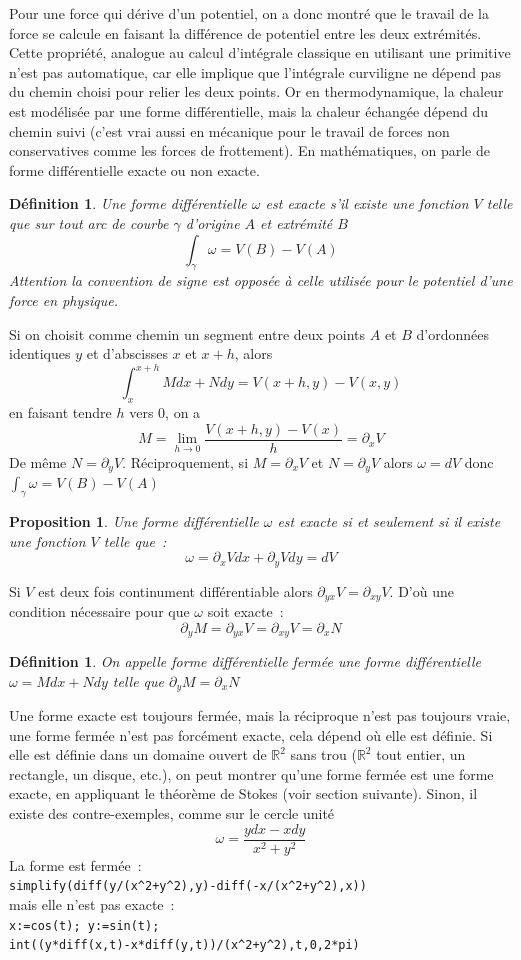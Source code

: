 \documentclass[a4paper,11pt]{article}
\newtheorem{defn}[thm]{D\'efinition}
\newtheorem{prop}[thm]{Proposition}
\newcommand{\R}{{\mathbb{R}}}
\begin{document}
Pour une force qui d\'erive d'un potentiel,
on a donc montr\'e que le travail de la force se calcule 
en faisant la diff\'erence
de potentiel entre les deux extr\'emit\'es. Cette propri\'et\'e, 
analogue au calcul d'int\'egrale classique en utilisant une primitive
n'est pas automatique, car elle implique que l'int\'egrale curviligne
ne d\'epend pas du chemin choisi pour relier les deux points.
Or en thermodynamique, la
chaleur est mod\'elis\'ee par une forme diff\'erentielle, 
mais la chaleur \'echang\'ee d\'epend du chemin
suivi (c'est vrai aussi en m\'ecanique pour le travail de forces non
conservatives comme les forces de frottement).
En math\'ematiques, on parle de forme diff\'erentielle exacte ou non exacte.
\begin{defn}
Une forme diff\'erentielle $\omega$ est exacte s'il existe une
fonction $V$ telle que sur tout arc de courbe $\gamma$ d'origine $A$ et 
extr\'emit\'e $B$
$$ \int_\gamma \omega = V(B)-V(A)$$
Attention la convention de signe est oppos\'ee \`a celle utilis\'ee
pour le potentiel d'une force en physique.
\end{defn}
Si on choisit comme chemin un segment entre deux points $A$ et $B$
d'ordonn\'ees identiques $y$ et d'abscisses $x$ et $x+h$, alors
$$ \int_x^{x+h} M dx+Ndy = V(x+h,y)-V(x,y) $$
en faisant tendre $h$ vers 0, on a 
$$M=\lim_{h\rightarrow 0} \frac{V(x+h,y)-V(x)}{h} = \partial_x V$$
De m\^eme $N=\partial_y V$.
R\'eciproquement, si $M=\partial_x V$ et $N=\partial_y V$ alors
$\omega=dV$ donc $\int_\gamma \omega=V(B)-V(A)$
\begin{prop}
Une forme diff\'erentielle $\omega$ est exacte si et seulement si il 
existe une fonction $V$ telle que~:
$$ \omega=\partial_x V dx + \partial_y V dy=dV$$
\end{prop}
Si $V$ est deux fois continument diff\'erentiable alors
$\partial_{yx} V = \partial_{xy} V$. D'o\`u
une condition n\'ecessaire pour que $\omega$ soit exacte~:
$$ \partial_y M = \partial_{yx} V = \partial_{xy} V = \partial_x N$$
\begin{defn}
On appelle forme diff\'erentielle
ferm\'ee une forme
diff\'erentielle $\omega=Mdx+Ndy$ telle que
$\partial_y M=\partial_x N$ 
\end{defn}
Une forme exacte est toujours ferm\'ee, mais la r\'eciproque n'est pas
toujours vraie, une forme ferm\'ee n'est pas forc\'ement exacte, cela
d\'epend o\`u elle est d\'efinie. Si elle est d\'efinie dans un
domaine ouvert de $\R^2$ sans trou ($\R^2$ tout entier,
un rectangle, un disque, etc.), 
on peut montrer qu'une forme 
ferm\'ee est une forme exacte, en appliquant le th\'eor\`eme 
de Stokes (voir section suivante). Sinon, il existe des
contre-exemples, comme sur le cercle unit\'e
$$\omega=\frac{ydx-xdy}{x^2+y^2}$$
La forme est ferm\'ee~:\\
\verb|simplify(diff(y/(x^2+y^2),y)-diff(-x/(x^2+y^2),x))|\\
mais elle n'est pas exacte~:\\
\verb|x:=cos(t); y:=sin(t);|\\
\verb|int((y*diff(x,t)-x*diff(y,t))/(x^2+y^2),t,0,2*pi)|
\end{document}
